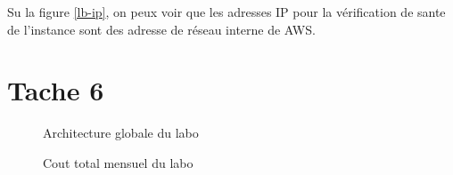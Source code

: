 \documentclass[french,a4paper,11pt]{article}
\begin{document}
    Su la figure \ref{lb-ip}, on peux voir que les adresses IP pour la vérification de sante de l'instance sont des adresse de réseau interne de AWS.

    \section{Tache 6}\label{sec:task-6}

    \begin{figure}
        \caption{\label{archi}Architecture globale du labo}
    \end{figure}

    \begin{figure}
        \caption{\label{total-cost}Cout total mensuel du labo}
    \end{figure}
\end{document}
